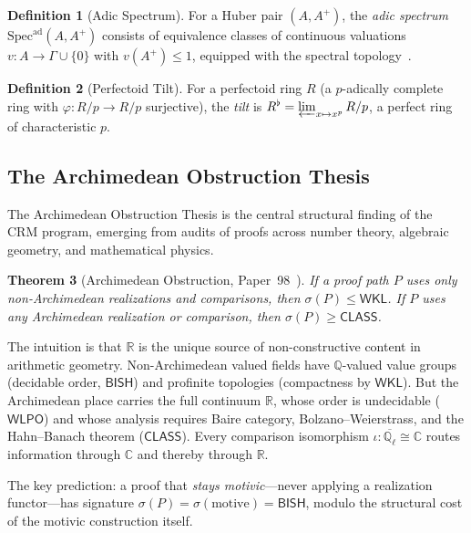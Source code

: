 \documentclass[11pt,a4paper]{article}
\theoremstyle{plain}
\newtheorem{theorem}{Theorem}[section]
\theoremstyle{definition}
\newtheorem{definition}[theorem]{Definition}
\newcommand{\BISH}{\textsf{BISH}}
\newcommand{\WKL}{\textsf{WKL}}
\newcommand{\WLPO}{\textsf{WLPO}}
\newcommand{\CLASS}{\textsf{CLASS}}
\newcommand{\Spec}{\mathrm{Spec}}
\newcommand{\Q}{\mathbb{Q}}
\newcommand{\R}{\mathbb{R}}
\newcommand{\C}{\mathbb{C}}
\newcommand{\sig}{\sigma}
\begin{document}
\begin{definition}[Adic Spectrum]\label{def:adic}
For a Huber pair $(A, A^+)$, the \emph{adic spectrum} $\Spec^{\mathrm{ad}}(A, A^+)$ consists of equivalence classes of continuous valuations $v: A \to \Gamma \cup \{0\}$ with $v(A^+) \leq 1$, equipped with the spectral topology~\cite{huber94}.
\end{definition}

\begin{definition}[Perfectoid Tilt]\label{def:tilt}
For a perfectoid ring $R$ (a $p$-adically complete ring with $\varphi: R/p \to R/p$ surjective), the \emph{tilt} is $R^\flat = \varprojlim_{x \mapsto x^p} R/p$, a perfect ring of characteristic $p$.
\end{definition}

\subsection{The Archimedean Obstruction Thesis}

The Archimedean Obstruction Thesis is the central structural finding of the CRM program, emerging from audits of proofs across number theory, algebraic geometry, and mathematical physics.

\begin{theorem}[Archimedean Obstruction, Paper~98~\cite{lee-p98}]\label{thm:archimedean}
If a proof path $P$ uses only non-Archimedean realizations and comparisons, then $\sig(P) \leq \WKL$. If $P$ uses any Archimedean realization or comparison, then $\sig(P) \geq \CLASS$.
\end{theorem}

The intuition is that $\R$ is the unique source of non-constructive content in arithmetic geometry. Non-Archimedean valued fields have $\Q$-valued value groups (decidable order, $\BISH$) and profinite topologies (compactness by $\WKL$). But the Archimedean place carries the full continuum $\R$, whose order is undecidable ($\WLPO$) and whose analysis requires Baire category, Bolzano--Weierstrass, and the Hahn--Banach theorem ($\CLASS$). Every comparison isomorphism $\iota: \overline{\Q_\ell} \cong \C$ routes information through $\C$ and thereby through $\R$.

The key prediction: a proof that \emph{stays motivic}---never applying a realization functor---has signature $\sig(P) = \sig(\text{motive}) = \BISH$, modulo the structural cost of the motivic construction itself.


\end{document}

